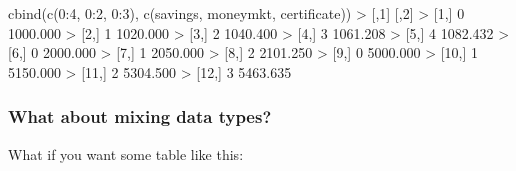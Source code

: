 \documentclass[
]{book}
\newenvironment{Shaded}{\begin{snugshade}}{\end{snugshade}}
\newcommand{\DecValTok}[1]{\textcolor[rgb]{0.00,0.00,0.81}{#1}}
\newcommand{\FloatTok}[1]{\textcolor[rgb]{0.00,0.00,0.81}{#1}}
\newcommand{\FunctionTok}[1]{\textcolor[rgb]{0.00,0.00,0.00}{#1}}
\newcommand{\NormalTok}[1]{#1}
\newcommand{\SpecialCharTok}[1]{\textcolor[rgb]{0.00,0.00,0.00}{#1}}
\begin{document}
\begin{Shaded}
\begin{Highlighting}[]
\FunctionTok{cbind}\NormalTok{(}\FunctionTok{c}\NormalTok{(}\DecValTok{0}\SpecialCharTok{:}\DecValTok{4}\NormalTok{, }\DecValTok{0}\SpecialCharTok{:}\DecValTok{2}\NormalTok{, }\DecValTok{0}\SpecialCharTok{:}\DecValTok{3}\NormalTok{), }\FunctionTok{c}\NormalTok{(savings, moneymkt, certificate))}
\SpecialCharTok{\textgreater{}}\NormalTok{       [,}\DecValTok{1}\NormalTok{]     [,}\DecValTok{2}\NormalTok{]}
\SpecialCharTok{\textgreater{}}\NormalTok{  [}\DecValTok{1}\NormalTok{,]    }\DecValTok{0} \FloatTok{1000.000}
\SpecialCharTok{\textgreater{}}\NormalTok{  [}\DecValTok{2}\NormalTok{,]    }\DecValTok{1} \FloatTok{1020.000}
\SpecialCharTok{\textgreater{}}\NormalTok{  [}\DecValTok{3}\NormalTok{,]    }\DecValTok{2} \FloatTok{1040.400}
\SpecialCharTok{\textgreater{}}\NormalTok{  [}\DecValTok{4}\NormalTok{,]    }\DecValTok{3} \FloatTok{1061.208}
\SpecialCharTok{\textgreater{}}\NormalTok{  [}\DecValTok{5}\NormalTok{,]    }\DecValTok{4} \FloatTok{1082.432}
\SpecialCharTok{\textgreater{}}\NormalTok{  [}\DecValTok{6}\NormalTok{,]    }\DecValTok{0} \FloatTok{2000.000}
\SpecialCharTok{\textgreater{}}\NormalTok{  [}\DecValTok{7}\NormalTok{,]    }\DecValTok{1} \FloatTok{2050.000}
\SpecialCharTok{\textgreater{}}\NormalTok{  [}\DecValTok{8}\NormalTok{,]    }\DecValTok{2} \FloatTok{2101.250}
\SpecialCharTok{\textgreater{}}\NormalTok{  [}\DecValTok{9}\NormalTok{,]    }\DecValTok{0} \FloatTok{5000.000}
\SpecialCharTok{\textgreater{}}\NormalTok{ [}\DecValTok{10}\NormalTok{,]    }\DecValTok{1} \FloatTok{5150.000}
\SpecialCharTok{\textgreater{}}\NormalTok{ [}\DecValTok{11}\NormalTok{,]    }\DecValTok{2} \FloatTok{5304.500}
\SpecialCharTok{\textgreater{}}\NormalTok{ [}\DecValTok{12}\NormalTok{,]    }\DecValTok{3} \FloatTok{5463.635}
\end{Highlighting}
\end{Shaded}

\hypertarget{what-about-mixing-data-types}{%
\subsubsection*{What about mixing data types?}\label{what-about-mixing-data-types}}

What if you want some table like this:
\end{document}

